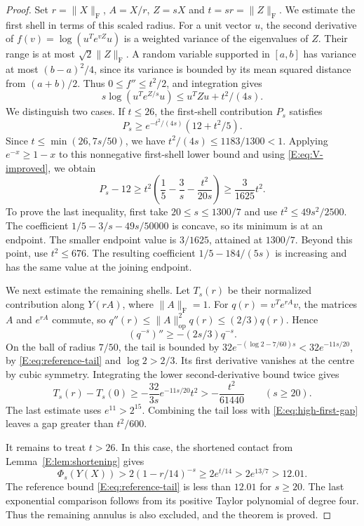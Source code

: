 \documentclass[reqno,english]{amsart}
\theoremstyle{definition}
\newtheorem{open problem}[theorem]{Open Problem}
\theoremstyle{remark}
\theoremstyle{plain}
\numberwithin{equation}{section}
\newcommand{\norm}[1]{\lVert#1\rVert_{\mathrm F}}
\newcommand{\opnorm}[1]{\lVert#1\rVert_{\mathrm{op}}}
\begin{document}
\begin{proof}
Set $r=\norm X$, $A=X/r$, $Z=sX$ and $t=sr=\norm Z$.
We estimate the first shell in terms of this scaled radius. For a
unit vector $u$, the second derivative of
$f(v)=\log(u^Te^{vZ}u)$ is a weighted variance of the eigenvalues
of $Z$. Their range is at most $\sqrt2\norm Z$. A random variable
supported in $[a,b]$ has variance at most $(b-a)^2/4$, since
its variance is bounded by its mean squared distance from
$(a+b)/2$. Thus $0\le f''\le t^2/2$, and integration gives
\[
 s\log(u^Te^{Z/s}u)\le u^TZu+t^2/(4s).
\]
We distinguish two cases. If $t\le26$, the first-shell contribution
$P_s$ satisfies
\[
 P_s\ge e^{-t^2/(4s)}(12+t^2/5).
\]
Since $t\le\min(26,7s/50)$, we have
$t^2/(4s)\le1183/1300<1$. Applying $e^{-x}\ge1-x$ to this
nonnegative first-shell lower bound and using
\eqref{E:eq:V-improved}, we obtain
\begin{equation}
 P_s-12\ge t^2\left(\frac15-\frac3s-\frac{t^2}{20s}\right)
 \ge\frac3{1625}t^2.
 \label{E:eq:high-first-gap}
\end{equation}
To prove the last inequality, first take $20\le s\le1300/7$ and
use $t^2\le49s^2/2500$. The coefficient
$1/5-3/s-49s/50000$ is concave, so its minimum is at an endpoint.
The smaller endpoint value is $3/1625$, attained at $1300/7$.
Beyond this point, use $t^2\le676$. The resulting coefficient
$1/5-184/(5s)$ is increasing and has the same value at the
joining endpoint.

We next estimate the remaining shells. Let $T_s(r)$ be their
normalized contribution along $Y(rA)$, where $\norm A=1$.
For $q(r)=v^Te^{rA}v$, the matrices $A$ and $e^{rA}$ commute,
so $q''(r)\le\opnorm A^2q(r)\le(2/3)q(r)$. Hence
\[
 (q^{-s})''\ge-(2s/3)q^{-s}.
\]
On the ball of radius $7/50$, the tail is bounded by
$32e^{-(\log2-7/60)s}<32e^{-11s/20}$, by
\eqref{E:eq:reference-tail} and $\log2>2/3$.
Its first derivative vanishes at the centre by cubic symmetry.
Integrating the lower second-derivative bound twice gives
\[
 T_s(r)-T_s(0)\ge-\frac{32}{3s}e^{-11s/20}t^2
 >-\frac{t^2}{61440}\qquad(s\ge20).
\]
The last estimate uses $e^{11}>2^{15}$. Combining the tail loss
with \eqref{E:eq:high-first-gap} leaves a gap greater than
$t^2/600$.

It remains to treat $t>26$. In this case, the shortened contact
from Lemma~\ref{E:lem:shortening} gives
\[
 \Phi_s(Y(X))>2(1-r/14)^{-s}\ge2e^{t/14}>2e^{13/7}>12.01.
\]
The reference bound \eqref{E:eq:reference-tail} is less than
$12.01$ for $s\ge20$. The last exponential comparison follows
from its positive Taylor polynomial of degree four. Thus the
remaining annulus is also excluded, and the theorem is proved.
\end{proof}
\end{document}
